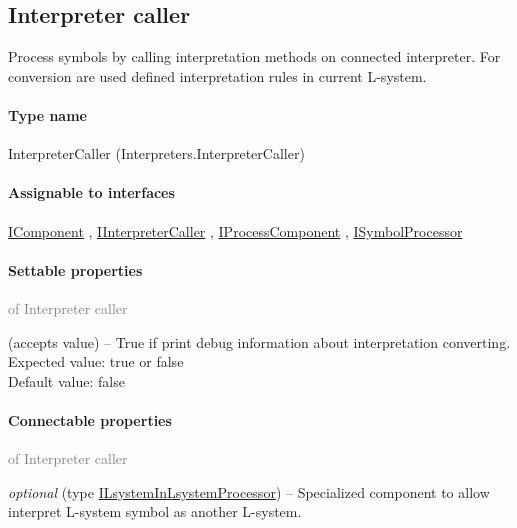 
\subsection{Interpreter caller}
\label{Malsys.Processing.Components.Interpreters.InterpreterCaller}
Process symbols by calling interpretation methods on connected interpreter.
            For conversion are used defined interpretation rules in current L-system.\paragraph{Type name}
InterpreterCaller (Interpreters.InterpreterCaller) 	\paragraph{Assignable to interfaces}
		\hyperref[Malsys.Processing.Components.IComponent]{IComponent}%
, 		\hyperref[Malsys.Processing.Components.IInterpreterCaller]{IInterpreterCaller}%
, 		\hyperref[Malsys.Processing.Components.IProcessComponent]{IProcessComponent}%
, 		\hyperref[Malsys.Processing.Components.ISymbolProcessor]{ISymbolProcessor}%
	\paragraph{Settable properties}\textcolor{gray}{of Interpreter caller}
	\begin{description*}
		\item[debugInterpretation]
		(accepts value)
			-- True if print debug information about interpretation converting.
			\\ Expected value: true or false
			\\ Default value: false
	\end{description*}
	\paragraph{Connectable properties}\textcolor{gray}{of Interpreter caller}
	\begin{description*}
		\item[LsystemInLsystemProcessor]
 \textit{optional} 		(type \hyperref[Malsys.Processing.Components.Common.ILsystemInLsystemProcessor]{ILsystemInLsystemProcessor})
			-- Specialized component to allow interpret L-system symbol as another L-system.
	\end{description*}
	
